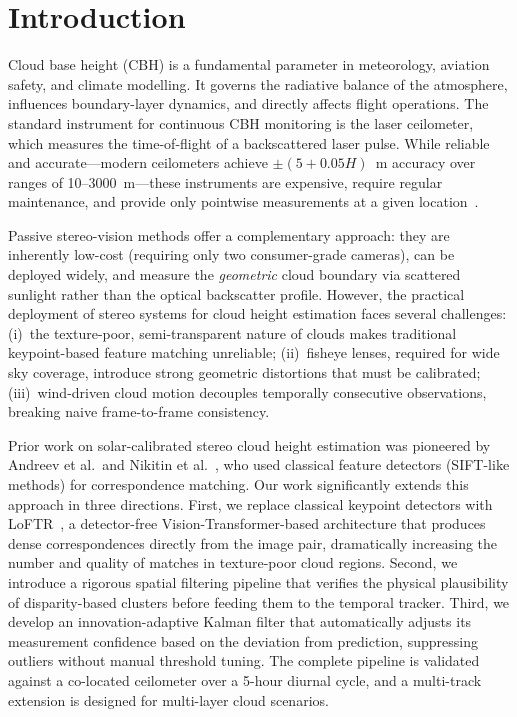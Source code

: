 \documentclass[preprint,
superscriptaddress,
amsmath,amssymb,aps,
twoside,final,secnumarabic,
nofootinbib]{revtex4-2}
\begin{document}
\par
{}

\maketitle
\thispagestyle{fancy}

\section{Introduction}\label{intro}

Cloud base height (CBH) is a fundamental parameter in meteorology, aviation safety, and climate modelling. It governs the radiative balance of the atmosphere, influences boundary-layer dynamics, and directly affects flight operations. The standard instrument for continuous CBH monitoring is the laser ceilometer, which measures the time-of-flight of a backscattered laser pulse. While reliable and accurate---modern ceilometers achieve $\pm(5 + 0.05H)$~m accuracy over ranges of 10--3000~m---these instruments are expensive, require regular maintenance, and provide only pointwise measurements at a given location~\cite{6}.

Passive stereo-vision methods offer a complementary approach: they are inherently low-cost (requiring only two consumer-grade cameras), can be deployed widely, and measure the \emph{geometric} cloud boundary via scattered sunlight rather than the optical backscatter profile. However, the practical deployment of stereo systems for cloud height estimation faces several challenges: (i)~the texture-poor, semi-transparent nature of clouds makes traditional keypoint-based feature matching unreliable; (ii)~fisheye lenses, required for wide sky coverage, introduce strong geometric distortions that must be calibrated; (iii)~wind-driven cloud motion decouples temporally consecutive observations, breaking naive frame-to-frame consistency.

Prior work on solar-calibrated stereo cloud height estimation was pioneered by Andreev et al.\ and Nikitin et al.~\cite{3,4}, who used classical feature detectors (SIFT-like methods) for correspondence matching. Our work significantly extends this approach in three directions. First, we replace classical keypoint detectors with LoFTR~\cite{1}, a detector-free Vision-Transformer-based architecture that produces dense correspondences directly from the image pair, dramatically increasing the number and quality of matches in texture-poor cloud regions. Second, we introduce a rigorous spatial filtering pipeline that verifies the physical plausibility of disparity-based clusters before feeding them to the temporal tracker. Third, we develop an innovation-adaptive Kalman filter that automatically adjusts its measurement confidence based on the deviation from prediction, suppressing outliers without manual threshold tuning. The complete pipeline is validated against a co-located ceilometer over a 5-hour diurnal cycle, and a multi-track extension is designed for multi-layer cloud scenarios.
\end{document}
